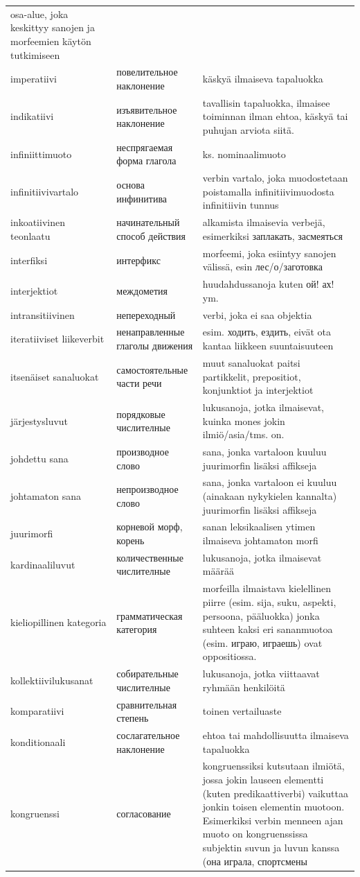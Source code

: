 \documentclass[]{scrreprt}
\begin{document}
\begin{longtable}[c]{p{4cm}p{4cm}p{7cm}}
osa-alue, joka keskittyy sanojen ja morfeemien käytön
tutkimiseen\tabularnewline
imperatiivi & повелительное наклонение & käskyä ilmaiseva
tapaluokka\tabularnewline
indikatiivi & изъявительное наклонение & tavallisin tapaluokka, ilmaisee
toiminnan ilman ehtoa, käskyä tai puhujan arviota siitä.\tabularnewline
infiniittimuoto & неспрягаемая форма глагола & ks.
nominaalimuoto\tabularnewline
infinitiivivartalo & основа инфинитива & verbin vartalo, joka
muodostetaan poistamalla infinitiivimuodosta infinitiivin
tunnus\tabularnewline
inkoatiivinen teonlaatu & начинательный способ действия & alkamista
ilmaisevia verbejä, esimerkiksi заплакать, засмеяться\tabularnewline
interfiksi & интерфикс & morfeemi, joka esiintyy sanojen välissä, esin
лес/о/заготовка\tabularnewline
interjektiot & междометия & huudahdussanoja kuten ой! ах!
ym.\tabularnewline
intransitiivinen & непереходный & verbi, joka ei saa
objektia\tabularnewline
iteratiiviset liikeverbit & ненаправленные глаголы движения & esim.
ходить, ездить, eivät ota kantaa liikkeen suuntaisuuteen\tabularnewline
itsenäiset sanaluokat & самостоятельные части речи & muut sanaluokat
paitsi partikkelit, prepositiot, konjunktiot ja
interjektiot\tabularnewline
järjestysluvut & порядковые числителные & lukusanoja, jotka ilmaisevat,
kuinka mones jokin ilmiö/asia/tms. on.\tabularnewline
johdettu sana & производное слово & sana, jonka vartaloon kuuluu
juurimorfin lisäksi affikseja\tabularnewline
johtamaton sana & непроизводное слово & sana, jonka vartaloon ei kuuluu
(ainakaan nykykielen kannalta) juurimorfin lisäksi
affikseja\tabularnewline
juurimorfi & корневой морф, корень & sanan leksikaalisen ytimen
ilmaiseva johtamaton morfi\tabularnewline
kardinaaliluvut & количественные числителные & lukusanoja, jotka
ilmaisevat määrää\tabularnewline
kieliopillinen kategoria & грамматическая категория & morfeilla
ilmaistava kielellinen piirre (esim. sija, suku, aspekti, persoona,
pääluokka) jonka suhteen kaksi eri sananmuotoa (esim. играю, играешь)
ovat oppositiossa.\tabularnewline
kollektiivilukusanat & собирательные числителные & lukusanoja, jotka
viittaavat ryhmään henkilöitä\tabularnewline
komparatiivi & сравнительная степень & toinen
vertailuaste\tabularnewline
konditionaali & сослагательное наклонение & ehtoa tai mahdollisuutta
ilmaiseva tapaluokka\tabularnewline
kongruenssi & согласование & kongruenssiksi kutsutaan ilmiötä, jossa
jokin lauseen elementti (kuten predikaattiverbi) vaikuttaa jonkin toisen
elementin muotoon. Esimerkiksi verbin menneen ajan muoto on
kongruenssissa subjektin suvun ja luvun kanssa (она играла, спортсмены

\end{longtable}
\end{document}
